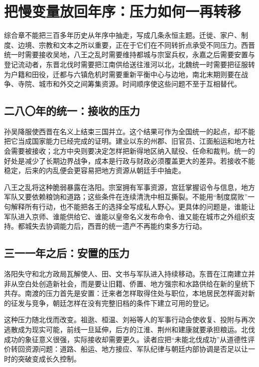 \section{把慢变量放回年序：压力如何一再转移}
\label{sec:synthesis-chronology-pressures}

综合章不能把三百多年历史从年序中抽走，写成几条永恒主题。迁徙、家户、制度、边境、宗教和文本之所以重要，正在于它们在不同转折点承受不同压力。西晋统一时需要接收吴地，八王之乱时需要维持都城与宗室兵权，永嘉之后需要安置与登记流动者，东晋北伐时需要把江南供给送往淮河以北，北魏统一时需要把征服转为户籍和田役，迁都与六镇危机时需要重新平衡中心与边地，南北末期则要在战争、寺院、城市和外交之间筹集资源。时间顺序使这些问题不至于互相替代。

\subsection{二八〇年的统一：接收的压力}

孙吴降服使西晋在名义上结束三国并立。这个结果可作为全国统一的起点，却不能把它当成国家能力已经完成的证明。建业以东的州郡、旧官员、江面船运和地方社会需要被接收；北方中央则要决定怎样把新得地区纳入赋役、任命和裁判。统一的好处是减少了长期边界战争，成本是行政与财政必须覆盖更大的差异。若接收不能稳定，后来的内乱便会更容易把地方资源从朝廷手中抽走。

八王之乱将这种脆弱暴露在洛阳。宗室拥有军事资源，宫廷掌握诏令与信息，地方军队又要依赖粮饷和道路；这些条件在连续清洗中相互撕裂。不能用“制度腐败”一句解释所有行动，也不能把各王的选择全写成私人野心。更具体的问题是，谁能让军队进入京师、谁能供给它、谁能以皇帝名义发布命令、谁又能在城市之外组织支持。都城失去协调能力后，西晋的统一遗产不再能约束多方行动。

\subsection{三一一年之后：安置的压力}

洛阳失守和北方政局瓦解使人、田、文书与军队进入持续移动。东晋在江南建立并非从空白处创造新社会，而是要让旧籍、侨置、地方强宗和水路供给在新的皇统下共存。南渡的压力首先是安置：迁来者怎样取得住处与职位，本地居民怎样面对新的征发与竞争，朝廷怎样在没有完整旧档的条件下建立可用的登记。

这种压力随北伐而改变。祖逖、桓温、刘裕等人的军事行动会使收复、投附与再次逃散成为现实可能，前线一旦延伸，后方的江淮、荆州和建康就要承担粮运。北伐成功的象征意义很强，实际接收却需要更久。读者应把“未能北伐成功”从道德性评价转回资源问题：道路、船运、地方接应、军队纪律与朝廷内部协调是否足以让一时的突破变成长久控制。

